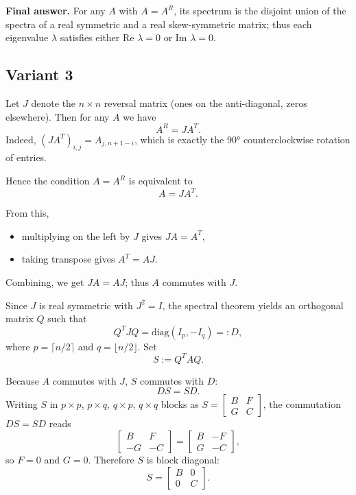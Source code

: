 \documentclass[12pt,a4paper]{article}
\theoremstyle{definition}
\begin{document}
    \textbf{Final answer.}
    For any $A$ with $A = A^R$, its spectrum is the disjoint union of the spectra of a real symmetric and a real skew-symmetric matrix; thus each eigenvalue $\lambda$ satisfies either $\text{Re } \lambda = 0$ or $\text{Im } \lambda = 0$.
    \subsection{Variant 3}
    Let $J$ denote the $n \times n$ reversal matrix (ones on the anti-diagonal, zeros elsewhere). Then for any $A$ we have
    $$A^R = J A^T.$$
    Indeed, $(J A^T)_{i,j} = A_{j,n+1-i}$, which is exactly the $90°$ counterclockwise rotation of entries.

    Hence the condition $A = A^R$ is equivalent to
    $$A = J A^T.$$

    From this,
    \begin{itemize}
        \item multiplying on the left by $J$ gives $J A = A^T$,
        \item taking transpose gives $A^T = A J$.
    \end{itemize}

    Combining, we get $J A = A J$; thus $A$ commutes with $J$.

    Since $J$ is real symmetric with $J^2 = I$, the spectral theorem yields an orthogonal matrix $Q$ such that
    $$Q^T J Q = \text{diag}(I_p, -I_q) =: D,$$
    where $p = \lceil n/2 \rceil$ and $q = \lfloor n/2 \rfloor$. Set
    $$S := Q^T A Q.$$

    Because $A$ commutes with $J$, $S$ commutes with $D$:
    $$D S = S D.$$
    Writing $S$ in $p \times p$, $p \times q$, $q \times p$, $q \times q$ blocks as $S = \begin{bmatrix} B & F \\ G & C \end{bmatrix}$, the commutation $D S = S D$ reads
    $$\begin{bmatrix} B & F \\ -G & -C \end{bmatrix} = \begin{bmatrix} B & -F \\ G & -C \end{bmatrix},$$
    so $F = 0$ and $G = 0$. Therefore $S$ is block diagonal:
    $$S = \begin{bmatrix} B & 0 \\ 0 & C \end{bmatrix}.$$
\end{document}
